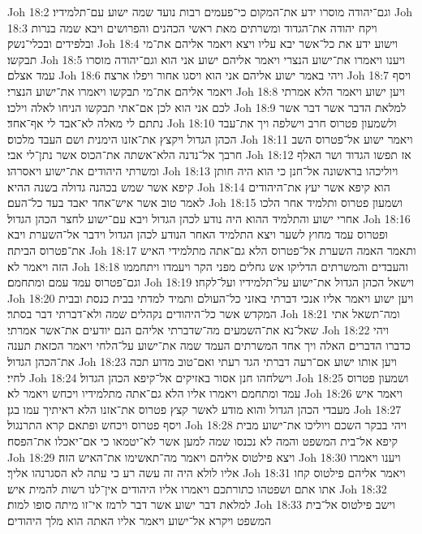 Joh 18:2  וגם־יהודה מוסרו ידע את־המקום כי־פעמים רבות נועד שמה ישוע עם־תלמידיו׃
Joh 18:3  ויקח יהודה את־הגדוד ומשרתים מאת ראשי הכהנים והפרושים ויבא שמה בנרות ובלפידים ובכלי־נשק׃
Joh 18:4  וישוע ידע את כל־אשר יבא עליו ויצא ויאמר אליהם את־מי תבקשו׃
Joh 18:5  ויענו ויאמרו את־ישוע הנצרי ויאמר אליהם ישוע אני הוא וגם־יהודה מוסרו עמד אצלם׃
Joh 18:6  ויהי באמר ישוע אליהם אני הוא ויסגו אחור ויפלו ארצה׃
Joh 18:7  ויסף ויאמר אליהם את־מי תבקשו ויאמרו את־ישוע הנצרי׃
Joh 18:8  ויען ישוע ויאמר הלא אמרתי לכם אני הוא לכן אם־אתי תבקשו הניחו לאלה וילכו׃
Joh 18:9  למלאת הדבר אשר דבר אשר נתתם לי מאלה לא־אבד לי אף־אחד׃
Joh 18:10  ולשמעון פטרוס חרב וישלפה ויך את־עבד הכהן הגדול ויקצץ את־אזנו הימנית ושם העבד מלכוס׃
Joh 18:11  ויאמר ישוע אל־פטרוס השב חרבך אל־נדנה הלא־אשתה את־הכוס אשר נתן־לי אבי׃
Joh 18:12  אז תפשו הגדוד ושר האלף ומשרתי היהודים את־ישוע ויאסרהו׃
Joh 18:13  ויוליכהו בראשונה אל־חנן כי הוא היה חותן קיפא אשר שמש בכהנה גדולה בשנה ההיא׃
Joh 18:14  הוא קיפא אשר יעץ את־היהודים לאמר טוב אשר איש־אחד יאבד בעד כל־העם׃
Joh 18:15  ושמעון פטרוס ותלמיד אחר הלכו אחרי ישוע והתלמיד ההוא היה נודע לכהן הגדול ויבא עם־ישוע לחצר הכהן הגדול׃
Joh 18:16  ופטרוס עמד מחוץ לשער ויצא התלמיד האחר הנודע לכהן הגדול וידבר אל־השערת ויבא את־פטרוס הביתה׃
Joh 18:17  ותאמר האמה השערת אל־פטרוס הלא גם־אתה מתלמידי האיש הזה ויאמר לא׃
Joh 18:18  והעבדים והמשרתים הדליקו אש גחלים מפני הקר ויעמדו ויתחממו וגם־פטרוס עמד עמם ומתחמם׃
Joh 18:19  וישאל הכהן הגדול את־ישוע על־תלמידיו ועל־לקחו׃
Joh 18:20  ויען ישוע ויאמר אליו אנכי דברתי באזני כל־העולם ותמיד למדתי בבית כנסת ובבית המקדש אשר כל־היהודים נקהלים שמה ולא־דברתי דבר בסתר׃
Joh 18:21  ומה־תשאל אתי שאל־נא את־השמעים מה־שדברתי אליהם הנם יודעים את־אשר אמרתי׃
Joh 18:22  ויהי כדברו הדברים האלה ויך אחד המשרתים העמד שמה את־ישוע על־הלחי ויאמר הכזאת תענה את־הכהן הגדול׃
Joh 18:23  ויען אותו ישוע אם־רעה דברתי הגד רעתי ואם־טוב מדוע תכה לחיי׃
Joh 18:24  וישלחהו חנן אסור באזיקים אל־קיפא הכהן הגדול׃
Joh 18:25  ושמעון פטרוס עמד ומתחמם ויאמרו אליו הלא גם־אתה מתלמידיו ויכחש ויאמר לא׃
Joh 18:26  ויאמר איש מעבדי הכהן הגדול והוא מודע לאשר קצץ פטרוס את־אזנו הלא ראיתיך עמו בגן׃
Joh 18:27  ויסף פטרוס ויכחש ופתאם קרא התרנגול׃
Joh 18:28  ויהי בבקר השכם ויוליכו את־ישוע מבית קיפא אל־בית המשפט והמה לא נכנסו שמה למען אשר לא־יטמאו כי אם־יאכלו את־הפסח׃
Joh 18:29  ויצא פילטוס אליהם ויאמר מה־תאשימו את־האיש הזה׃
Joh 18:30  ויענו ויאמרו אליו לולא היה זה עשה רע כי עתה לא הסגרנהו אליך׃
Joh 18:31  ויאמר אליהם פילטוס קחו אתו אתם ושפטהו כתורתכם ויאמרו אליו היהודים אין־לנו רשות להמית איש׃
Joh 18:32  למלאת דבר ישוע אשר דבר לרמז אי־זו מיתה סופו למות׃
Joh 18:33  וישב פילטוס אל־בית המשפט ויקרא אל־ישוע ויאמר אליו האתה הוא מלך היהודים׃
